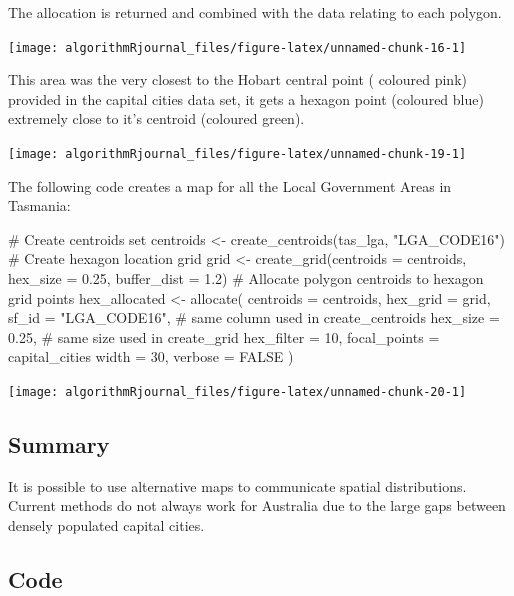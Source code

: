 The allocation is returned and combined with the data relating to each
polygon.

\begin{Schunk}

\texttt{[image: algorithmRjournal\_files/figure-latex/unnamed-chunk-16-1]} \end{Schunk}

This area was the very closest to the Hobart central point ( coloured
pink) provided in the capital cities data set, it gets a hexagon point
(coloured blue) extremely close to it's centroid (coloured green).

\begin{Schunk}

\texttt{[image: algorithmRjournal\_files/figure-latex/unnamed-chunk-19-1]} \end{Schunk}

The following code creates a map for all the Local Government Areas in
Tasmania:

\begin{Schunk}
\begin{Sinput}
# Create centroids set
centroids <- create_centroids(tas_lga, "LGA_CODE16")
# Create hexagon location grid
grid <- create_grid(centroids = centroids,
    hex_size = 0.25,
    buffer_dist = 1.2)
# Allocate polygon centroids to hexagon grid points
hex_allocated <- allocate(
  centroids = centroids,
  hex_grid = grid,
  sf_id = "LGA_CODE16",
  # same column used in create_centroids
  hex_size = 0.25,
  # same size used in create_grid
  hex_filter = 10,
  focal_points = capital_cities %
  width = 30,
  verbose = FALSE
)
\end{Sinput}
\end{Schunk}

\begin{Schunk}

\texttt{[image: algorithmRjournal\_files/figure-latex/unnamed-chunk-20-1]} \end{Schunk}

\hypertarget{summary}{%
\subsection{Summary}\label{summary}}

It is possible to use alternative maps to communicate spatial
distributions. Current methods do not always work for Australia due to
the large gaps between densely populated capital cities.

\hypertarget{code}{%
\subsection{Code}\label{code}}

